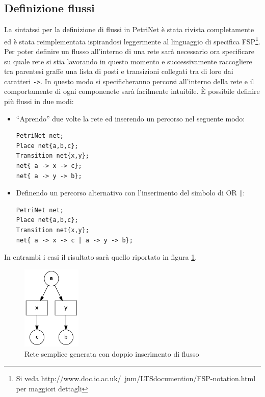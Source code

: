 \documentclass[italian,12pt]{book}
\begin{document}
\subsection{Definizione flussi}\label{ssect:nuovi_archi}
La sintatssi per la definizione di flussi in PetriNet è stata rivista completamente ed è stata 
reimplementata ispirandosi leggermente al linguaggio di specifica FSP\footnote{ Si veda 
http://www.doc.ic.ac.uk/~jnm/LTSdocumention/FSP-notation.html per maggiori dettagli}.\\
Per poter definire un flusso all'interno di una rete sarà necessario ora specificare su quale rete si stia 
lavorando in questo momento e successivamente raccogliere tra parentesi graffe una lista di posti e transizioni
collegati tra di loro dai caratteri {\tt ->}. In questo modo si specificheranno percorsi all'interno della 
rete e il comportamente di ogni componenete sarà facilmente intuibile.
È possibile definire più flussi in due modi:
\begin{itemize}

\item ``Aprendo'' due volte la rete ed inserendo un percorso nel seguente modo:
\begin{verbatim}PetriNet net;
Place net{a,b,c};
Transition net{x,y};
net{ a -> x -> c};
net{ a -> y -> b};
\end{verbatim}

\item Definendo un percorso alternativo con l'inserimento del simbolo di OR {\tt |}:
\begin{verbatim}PetriNet net;
Place net{a,b,c};
Transition net{x,y};
net{ a -> x -> c | a -> y -> b};
\end{verbatim}
\end{itemize}

In entrambi i casi il risultato sarà quello riportato in figura \ref{fig:flussi1.png}.
\begin{figure}[htb]
\centerline{\includegraphics[height=4cm]{img/flussi1.png}}
\caption{Rete semplice generata con doppio inserimento di flusso}\label{fig:flussi1.png}
\end{figure}
\end{document}
